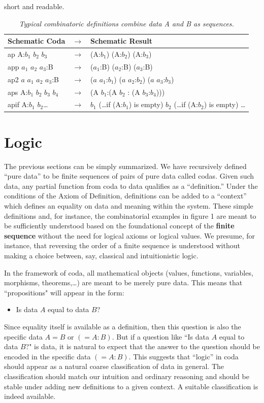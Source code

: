 \documentclass[11pt]{article}
\begin{document}
short and readable.  
\begin{table}
\begin{tabular}{| l  l  l | }
Schematic Coda & $\rightarrow$ & Schematic Result \\
\hline
ap A:$b_1$ $b_2$ $b_3$ & $\rightarrow$ & (A:$b_1$) (A:$b_2$) (A:$b_3$) \\
app $a_1$ $a_2$ $a_3$:B &  $\rightarrow$ & ($a_1$:B) ($a_2$:B) ($a_3$:B) \\
ap2 $a$ $a_1$ $a_2$ $a_3$:B & $\rightarrow$ & ($a$ $a_1$:$b_1$) ($a$ $a_2$:$b_2$) ($a$ $a_3$:$b_3$) \\
aps A:$b_1$ $b_2$ $b_3$ $b_4$ & $\rightarrow$ & (A $b_1$:(A $b_2$ : (A $b_3$:$b_4$))) \\
apif A:$b_1$ $b_2$\dots & $\rightarrow$ & $b_1$ (\dots if (A:$b_1$) is empty) $b_2$ (\dots if (A:$b_2$) is empty) \dots \\
\hline
\end{tabular} 
\caption{\label{ }{\it Typical combinatoric definitions combine data A and B as sequences.}}   
\end{table}

\section{Logic}

The previous sections can be simply summarized.  We have recursively defined ``pure data'' to be finite sequences of pairs of pure data called codas.  Given such 
data,  any partial function from coda to data qualifies as a ``definition.''  Under the conditions of the Axiom of Definition, definitions can be added to 
a ``context'' which defines an equality on data and meaning within the system.  
These simple definitions and, for instance, the combinatorial examples in figure 1 are meant to be sufficiently understood based on the foundational concept 
of the {\bf finite sequence} without the need for logical axioms or logical values.   We presume, for instance, that reversing the order of a finite 
sequence is understood without making a choice between, say, classical and intuitionistic logic.  

    In the framework of coda, all mathematical objects (values, functions, variables, morphisms, theorems,\dots) are meant to be merely pure data.  This means 
that ``propositions" will appear in the form: 
\begin{itemize}
\item[] Is data $A$ equal to data $B$?
\end{itemize}
Since equality itself is available as a definition, then this question is also the specific data $A=B$ or $(=A:B)$.  But if a question like ``Is data $A$ equal to data $B$?" is data, 
it is natural to expect that the answer to the question should be encoded in the specific data $(=A:B)$.  This suggests that ``logic'' in coda should appear as 
a natural coarse classification of data in general.  The classification should match our intuition and ordinary reasoning and should be stable under 
adding new definitions to a given context.  A suitable classification is indeed available.  
\end{document}
